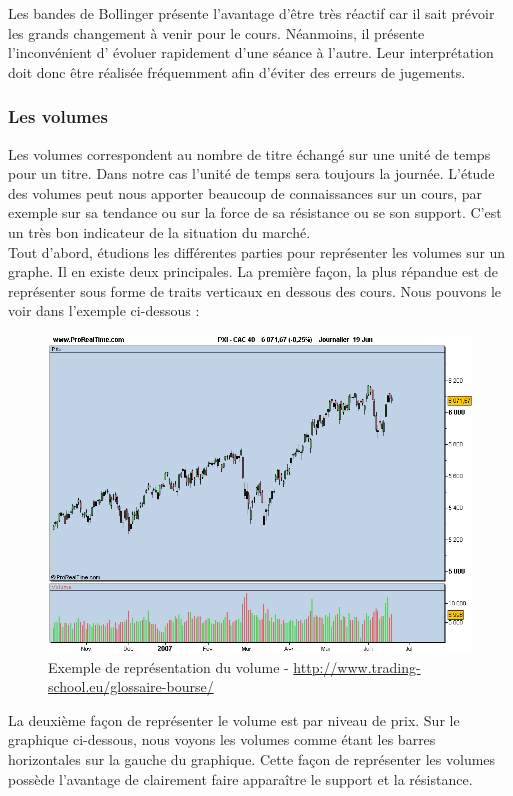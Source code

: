 Les bandes de Bollinger présente l'avantage d'être très réactif car il sait prévoir les grands changement à venir pour le cours. Néanmoins, il présente l'inconvénient d' évoluer rapidement d'une séance à l'autre. Leur interprétation doit donc être réalisée fréquemment afin d'éviter des erreurs de jugements.  

\subsubsection{Les volumes}
Les volumes correspondent au nombre de titre échangé sur une unité de temps pour un titre. Dans notre cas l'unité de temps sera toujours la journée. L'étude des volumes peut nous apporter beaucoup de connaissances sur un cours, par exemple sur sa tendance ou sur la force de sa résistance ou se son support. C'est un très bon indicateur de la situation du marché. \\

Tout d'abord, étudions les différentes parties pour représenter les volumes sur un graphe. Il en existe deux principales. La première façon, la plus répandue est de représenter sous forme de traits verticaux en dessous des cours. Nous pouvons le voir dans l'exemple ci-dessous : 

\begin{figure}[H]
  \center
  \includegraphics[scale=0.5]{../graph/volumeBarre.png} 
  \caption{Exemple de représentation du volume - \url{http://www.trading-school.eu/glossaire-bourse/}}
\end{figure} 

La deuxième façon de représenter le volume est par niveau de prix. Sur le graphique ci-dessous, nous voyons les volumes comme étant les barres horizontales sur la gauche du graphique. Cette façon de représenter les volumes possède l'avantage de clairement faire apparaître le support et la résistance. 

